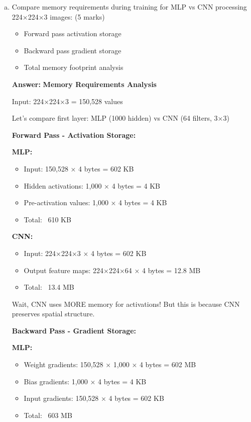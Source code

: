 \documentclass[12pt]{article}
\newcommand{\answer}[1]{{\color{answercolor}\textbf{Answer:} #1}}
\newcommand{\explanation}[1]{{\color{explanationcolor}#1}}
\begin{document}
\begin{enumerate}[(a)]
    \item Compare memory requirements during training for MLP vs CNN processing 224×224×3 images: \hfill (5 marks)
    \begin{itemize}
        \item Forward pass activation storage
        \item Backward pass gradient storage  
        \item Total memory footprint analysis
    \end{itemize}
    
    \answer{
    \textbf{Memory Requirements Analysis}
    
    \explanation{
    Input: 224×224×3 = 150,528 values
    
    Let's compare first layer: MLP (1000 hidden) vs CNN (64 filters, 3×3)
    }
    
    \textbf{Forward Pass - Activation Storage:}
    
    \explanation{
    \textbf{MLP:}
    \begin{itemize}
        \item Input: 150,528 × 4 bytes = 602 KB
        \item Hidden activations: 1,000 × 4 bytes = 4 KB  
        \item Pre-activation values: 1,000 × 4 bytes = 4 KB
        \item Total: ~610 KB
    \end{itemize}
    
    \textbf{CNN:}
    \begin{itemize}
        \item Input: 224×224×3 × 4 bytes = 602 KB
        \item Output feature maps: 224×224×64 × 4 bytes = 12.8 MB
        \item Total: ~13.4 MB
    \end{itemize}
    
    Wait, CNN uses MORE memory for activations! But this is because CNN preserves spatial structure.
    }
    
    \textbf{Backward Pass - Gradient Storage:}
    
    \explanation{
    \textbf{MLP:}
    \begin{itemize}
        \item Weight gradients: 150,528 × 1,000 × 4 bytes = 602 MB
        \item Bias gradients: 1,000 × 4 bytes = 4 KB
        \item Input gradients: 150,528 × 4 bytes = 602 KB
        \item Total: ~603 MB
    \end{itemize}
    
}}
\end{enumerate}
\end{document}
